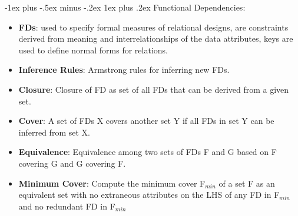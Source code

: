 \documentclass[12pt, landscape]{article}
\makeatletter
\renewcommand{\subsubsection}{\@startsection{subsubsection}{3}{0.1mm}%
                                {-1ex plus -.5ex minus -.2ex}%
                                {1ex plus .2ex}%
                                {\normalfont\small\bfseries}}
\makeatother
\begin{document}
\begin{multicols*}{3}
\subsubsection{Functional Dependencies:} 
\begin{itemize}
\item \textbf{FDs}: used to specify formal measures of relational designs, are constraints derived from meaning and interrelationships of the data attributes, keys are used to define normal forms for 
relations.
\item \textbf{Inference Rules}: Armstrong rules for inferring new FDs.
\item \textbf{Closure}: Closure of FD as set of all FDs that can be derived from a given set.
\item \textbf{Cover}: A set of FDs X covers another set Y if all FDs in set Y can be inferred from set X.
\item \textbf{Equivalence}: Equivalence among two sets of FDs F and G based on F covering G and G covering F.
\item \textbf{Minimum Cover}: Compute the minimum cover F$_{min}$ of 
a set F as an equivalent set with no extraneous attributes on the LHS of any FD in F$_{min}$ and no redundant FD in F$_{min}$
\end{itemize}


\columnbreak


\end{multicols*}
\end{document}
